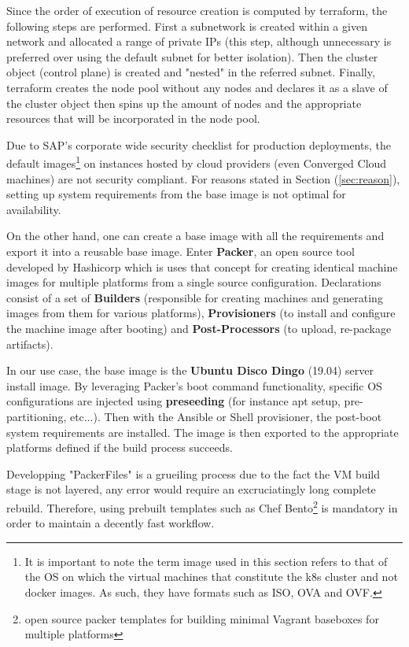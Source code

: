 \documentclass[11pt]{article}
\begin{document}
Since the order of execution of resource creation is computed by terraform, the following steps are performed. First a subnetwork is created within a given network and allocated a range of private IPs (this step, although unnecessary is preferred over using the default subnet for better isolation). Then the cluster object (control plane) is created and "nested" in the referred subnet. Finally, terraform creates the node pool without any nodes and declares it as a slave of the cluster object then spins up the amount of nodes and the appropriate resources that will be incorporated in the node pool. 

\pagebreak
{}

\vspace{-5mm}\hspace{5mm} Due to SAP's corporate wide security checklist for production deployments, the default images\footnote{It is important to note the term image used in this section refers to that of the OS on which the virtual machines that constitute the k8s cluster and not docker images. 
As such, they have formats such as ISO, OVA and OVF.} on instances hosted by cloud providers (even Converged Cloud machines) are not security compliant. For reasons stated in Section (\ref{sec:reason}), setting up system requirements from the base image is not optimal for availability. 

On the other hand, one can create a base image with all the requirements and export it into a reusable base image. Enter \textbf{Packer}, an open source tool developed by Hashicorp which is uses that concept for creating identical machine images for multiple platforms from a single source configuration. Declarations consist of a set of \textbf{Builders} (responsible for creating machines and generating images from them for various platforms), \textbf{Provisioners} (to install and configure the machine image after booting) and \textbf{Post-Processors} (to upload, re-package artifacts). 

In our use case, the base image is the \textbf{Ubuntu Disco Dingo} (19.04) server install image. By leveraging Packer's boot command functionality, specific OS configurations are injected using \textbf{preseeding} (for instance apt setup, pre-partitioning, etc...). Then with the Ansible or Shell provisioner, the post-boot system requirements are installed. The image is then exported to the appropriate platforms defined if the build process succeeds.

Developping "PackerFiles" is a grueiling process due to the fact the VM build stage is not layered, any error would require an excruciatingly long complete rebuild. Therefore, using prebuilt templates such as Chef Bento\footnote{open source packer templates for building minimal Vagrant baseboxes for multiple platforms} is mandatory in order to maintain a decently fast workflow. 
\end{document}
